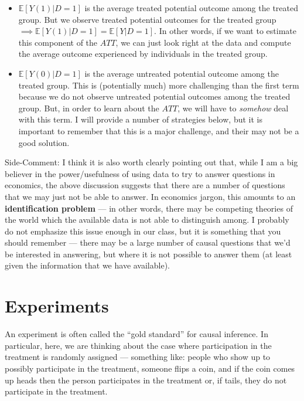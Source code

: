 \documentclass[
  letterpaper,
  DIV=11,
  numbers=noendperiod]{scrreprt}
\begin{document}
\begin{itemize}
\item
  \(\mathbb{E}[Y(1)|D=1]\) is the average treated potential outcome
  among the treated group. But we observe treated potential outcomes for
  the treated group
  \(\implies \mathbb{E}[Y(1)|D=1] = \mathbb{E}[Y|D=1]\). In other words,
  if we want to estimate this component of the \(ATT\), we can just look
  right at the data and compute the average outcome experienced by
  individuals in the treated group.
\item
  \(\mathbb{E}[Y(0)|D=1]\) is the average untreated potential outcome
  among the treated group. This is (potentially much) more challenging
  than the first term because we do not observe untreated potential
  outcomes among the treated group. But, in order to learn about the
  \(ATT\), we will have to \emph{somehow} deal with this term. I will
  provide a number of strategies below, but it is important to remember
  that this is a major challenge, and their may not be a good solution.
\end{itemize}

{Side-Comment:} I think it is also worth clearly pointing out that,
while I am a big believer in the power/usefulness of using data to try
to answer questions in economics, the above discussion suggests that
there are a number of questions that we may just not be able to answer.
In economics jargon, this amounts to an \textbf{identification problem}
--- in other words, there may be competing theories of the world which
the available data is not able to distinguish among. I probably do not
emphasize this issue enough in our class, but it is something that you
should remember --- there may be a large number of causal questions that
we'd be interested in answering, but where it is not possible to answer
them (at least given the information that we have available).

\section{Experiments}\label{experiments}

An experiment is often called the ``gold standard'' for causal
inference. In particular, here, we are thinking about the case where
participation in the treatment is randomly assigned --- something like:
people who show up to possibly participate in the treatment, someone
flips a coin, and if the coin comes up heads then the person
participates in the treatment or, if tails, they do not participate in
the treatment.
\end{document}
